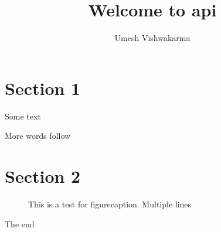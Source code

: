 \documentclass{article}
\begin{document}
\title{Welcome to api}
\author{Umesh Vishwakarma}

\maketitle

\section{Section 1}

Some text

More words follow

\section{Section 2}

\begin{figure}
\caption{This is a test for figurecaption. 
Multiple lines}
\end{figure}

The end
\end{document}

